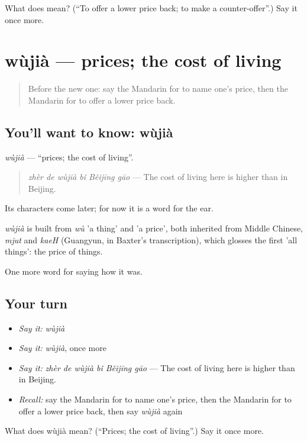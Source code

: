 \begin{tcolorbox}[breakable,colback=teal!4,colframe=teal!35!black,title={Before you move on}]
What does  mean? (\textquotedblleft{}To offer a lower price back; to make a counter-offer\textquotedblright{}.) Say it once more.
\end{tcolorbox}
\section[wùjià]{wùjià — prices; the cost of living}

\label{lesson:ZH-C524-wujia}



\begin{quote}
Before the new one: say the Mandarin for to name one's price, then the Mandarin for to offer a lower price back.
\end{quote}

\subsection*{You'll want to know: wùjià}
\emph{wùjià} — \textquotedblleft{}prices; the cost of living\textquotedblright{}.

\begin{quote}
\emph{zhèr de wùjià bǐ Běijīng gāo} — The cost of living here is higher than in Beijing.
\end{quote}

Its characters come later; for now it is a word for the ear.

\begin{cousinweb}
\emph{wùjià} is built from \emph{wù} 'a thing' and  'a price', both inherited from Middle Chinese, \emph{mjut} and \emph{kaeH} (Guangyun, in Baxter's transcription), which glosses the first 'all things': the price of things.
\end{cousinweb}

\begin{grammarlens}[title={What you've built}]
One more word for saying how it was.
\end{grammarlens}

\subsection*{Your turn}
\begin{itemize}
\raggedright
  \item \emph{Say it:} \emph{wùjià}
  \item \emph{Say it:} \emph{wùjià}, once more
  \item \emph{Say it:} \emph{zhèr de wùjià bǐ Běijīng gāo} — The cost of living here is higher than in Beijing.
  \item \emph{Recall:} say the Mandarin for to name one's price, then the Mandarin for to offer a lower price back, then say \emph{wùjià} again
\end{itemize}

\begin{tcolorbox}[breakable,colback=teal!4,colframe=teal!35!black,title={Before you move on}]
What does wùjià mean? (\textquotedblleft{}Prices; the cost of living\textquotedblright{}.) Say it once more.
\end{tcolorbox}
